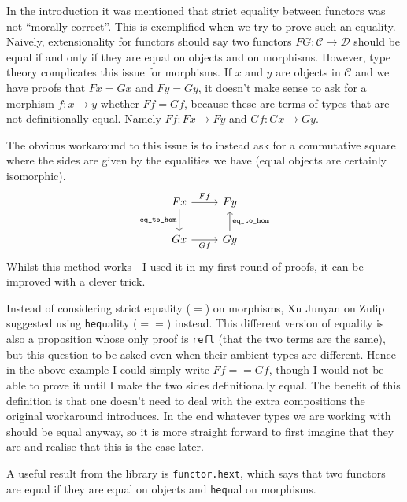 \documentclass{article}
\newcommand{\CC}{\mathcal{C}}
\newcommand{\DD}{\mathcal{D}}
\newcommand{\<}{\langle}
\renewcommand{\>}{\rangle}
\theoremstyle{definitionstyle}
\theoremstyle{exercisestyle}
\theoremstyle{remarkstyle}
\begin{document}
In the introduction it was mentioned that strict equality between
functors was not ``morally correct''.
This is exemplified when we try to prove such an equality.
Naively, extensionality for functors should say two functors $F G : \CC \to \DD$
should be equal if and only if they are equal on objects and on morphisms.
However, type theory complicates this issue for morphisms.
If $x$ and $y$ are objects in $\CC$ and we have proofs that $F x = G x$ and $F y = G y$,
it doesn't make sense to ask for a morphism $f : x \to y$ whether $F f = G f$,
because these are terms of types that are not definitionally equal.
Namely $F f : F x \to F y$ and $G f : G x \to G y$.

The obvious workaround to this issue is to instead ask for a commutative square
where the sides are given by the equalities we have (equal objects are certainly isomorphic).
\[\begin{tikzcd}
	{F x} & {F y} \\
	Gx & Gy
	\arrow["{F f}", from=1-1, to=1-2]
	\arrow["{\texttt{eq\_to\_hom}}"', from=1-1, to=2-1]
	\arrow["Gf"', from=2-1, to=2-2]
	\arrow["{\texttt{eq\_to\_hom}}"', from=2-2, to=1-2]
\end{tikzcd}\]
Whilst this method works - I used it in my first round of proofs,
it can be improved with a clever trick.

Instead of considering strict equality ($=$) on morphisms,
Xu Junyan on Zulip suggested using \texttt{heq}uality ($==$) instead.
This different version of equality is also a proposition whose only
proof is \texttt{refl} (that the two terms are the same),
but this question to be asked even when their ambient types are different.
Hence in the above example I could simply write $F f == G f$,
though I would not be able to prove it until I make the two sides
definitionally equal.
The benefit of this definition is that one doesn't need to deal with the
extra compositions the original workaround introduces.
In the end whatever types we are working with should be equal
anyway, so it is more straight forward to first imagine that they are and realise that
this is the case later.

A useful result from the library is \texttt{functor.hext},
which says that two functors are equal if they are equal on objects and
\texttt{heq}ual on morphisms.







{}

\end{document}
